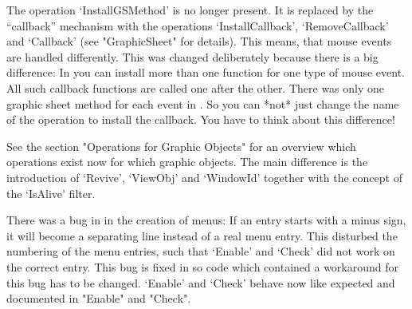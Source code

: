 The operation `InstallGSMethod' is no longer present. It is replaced by the 
``callback'' mechanism with the operations `InstallCallback',
`RemoveCallback' and `Callback' (see "GraphicSheet" for details). This
means, that mouse events are handled differently. This was changed
deliberately because there is a big difference: In {} you can install 
more than one function for one type of mouse event. All such callback
functions are called one after the other. There was only one graphic sheet
method for each event in {}. So you can *not* just change the name of 
the operation to install the callback. You have to think about this
difference! 

See the section "Operations for Graphic Objects" for an overview
which operations exist now for which graphic objects. The main difference
is the introduction of `Revive', `ViewObj' and `WindowId' together with the 
concept of the `IsAlive' filter.

There was a bug in {} in the creation of menus: If an entry starts
with a minus sign, it will become a separating line instead of a real menu
entry. This disturbed the numbering of the menu entries, such that `Enable' 
and `Check' did not work on the correct entry. This bug is fixed in
{} so code which contained a workaround for this bug has to be
changed. `Enable' and `Check' behave now like expected and documented in
"Enable" and "Check".


